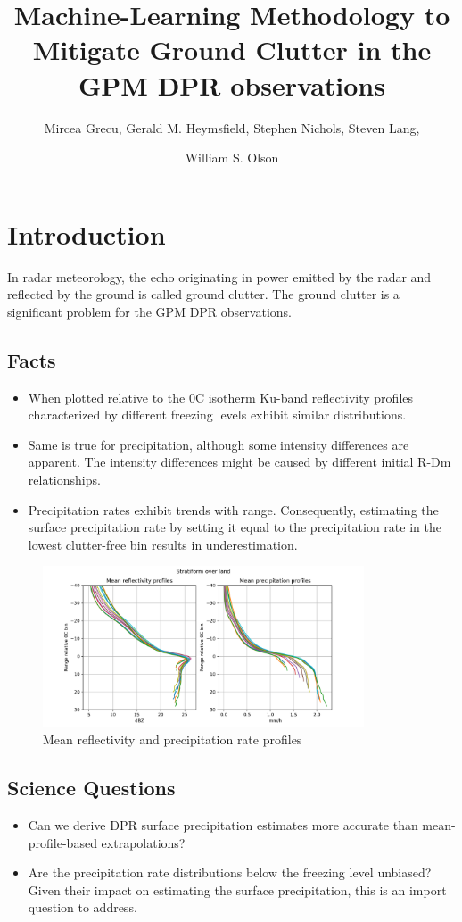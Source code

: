 \documentclass{article}
\title{Machine-Learning Methodology to Mitigate Ground Clutter in the 
GPM DPR observations}
\author{Mircea Grecu, Gerald M. Heymsfield, Stephen Nichols, Steven Lang, \and William S. Olson}
\begin{document}
\maketitle
\section*{Introduction}
In radar meteorology, the echo originating in power emitted by the radar
and reflected by the ground is called ground clutter. The ground 
clutter is a significant problem for the GPM DPR observations. 

\subsection*{Facts}
\begin{itemize}
    \item
      When plotted relative to the 0C isotherm Ku-band reflectivity profiles
      characterized by different freezing levels exhibit similar
      distributions.
    \item
      Same is true for precipitation, although some intensity differences
      are apparent. The intensity differences might be caused by different
      initial R-Dm relationships.
    \item
      Precipitation rates exhibit trends with range. Consequently,
      estimating the surface precipitation rate by setting it equal to the
      precipitation rate in the lowest clutter-free bin results in
      underestimation.
    
    \end{itemize}
    \begin{figure}[h]
        \centering
        \includegraphics[width=0.85\textwidth]{reflectivityProfiles.png}
        \caption{Mean reflectivity and precipitation rate profiles}
        \label{fig:fig1}
    \end{figure}
\subsection*{Science Questions}   
    \begin{itemize}
    \item
      Can we derive DPR surface precipitation estimates more accurate than
      mean-profile-based extrapolations?
    \item
      Are the precipitation rate distributions below the freezing level
      unbiased? Given their impact on estimating the surface precipitation,
      this is an import question to address.
    \end{itemize}
    
\end{document}
